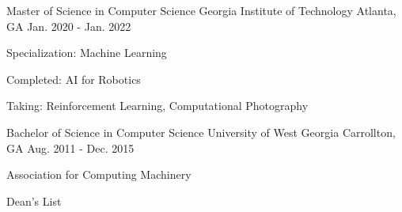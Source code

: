 
\begin{cventries}
  \cventry
    {Master of Science in Computer Science} %
    {Georgia Institute of Technology} %
    {Atlanta, GA} %
    {Jan. 2020 - Jan. 2022} %
    {
      \begin{cvitems} %
         \item {Specialization: Machine Learning}
         \item {Completed: AI for Robotics}
         \item {Taking: Reinforcement Learning, Computational Photography}
      \end{cvitems}
    }
    
  \cventry
    {Bachelor of Science in Computer Science} %
    {University of West Georgia} %
    {Carrollton, GA} %
    {Aug. 2011 - Dec. 2015} %
    {
      \begin{cvitems} %
         \item {Association for Computing Machinery}
         \vspace{0.5mm}
         \item {Dean's List}
      \end{cvitems}
    }
\end{cventries}
